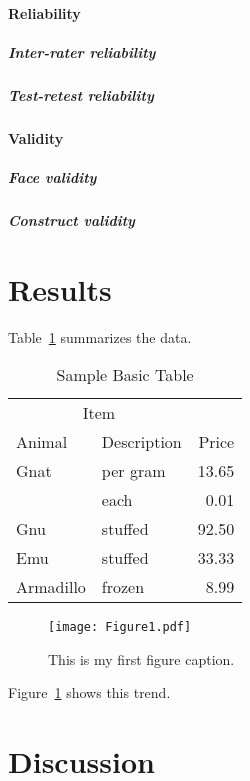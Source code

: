 \documentclass[man]{apa7}
\begin{document}
\paragraph{Reliability}
\lipsum[9]

\subparagraph{Inter-rater reliability}
\lipsum[10]

\subparagraph{Test-retest reliability}
\lipsum[11]

\paragraph{Validity}
\lipsum[12]

\subparagraph{Face validity}
\lipsum[13]

\subparagraph{Construct validity}
\lipsum[14]

\section{Results}
Table~\ref{tab:BasicTable} summarizes the data. \lipsum[15]

\begin{table}
  \caption{Sample Basic Table}
  \label{tab:BasicTable}
  \begin{tabular}{@{}llr@{}}         \toprule
  \multicolumn{2}{c}{Item}        \\ \cmidrule(r){1-2}
  Animal    & Description & Price \\ \midrule
  Gnat      & per gram    & 13.65 \\
            & each        &  0.01 \\
  Gnu       & stuffed     & 92.50 \\
  Emu       & stuffed     & 33.33 \\
  Armadillo & frozen      &  8.99 \\ \bottomrule
  \end{tabular}
\end{table}

\begin{figure}
    \caption{This is my first figure caption.}
    \texttt{[image: Figure1.pdf]}
    \label{fig:Figure1}
\end{figure}

Figure~\ref{fig:Figure1} shows this trend. \lipsum[16]

\section{Discussion}
\lipsum[17]
\end{document}
